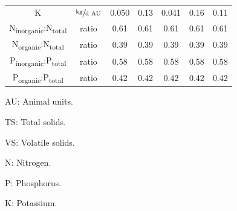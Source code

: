 \begin{refsection}[referencesCh6]
\begin{table}[h]
{\begin{threeparttable}
\begin{tabular}{@{}ccccccc@{}}
				K                 & $\sfrac{\text{kg}}{\text{d AU}}$ & 0.050          & 0.13          & 0.041 & 0.16            & 0.11                   \\
				N\textsubscript{inorganic}:N\textsubscript{total} & ratio     & 0.61          & 0.61          & 0.61 & 0.61            & 0.61                   \\
				N\textsubscript{organic}:N\textsubscript{total}   & ratio     & 0.39          & 0.39          & 0.39 & 0.39            & 0.39                   \\
				P\textsubscript{inorganic}:P\textsubscript{total} & ratio     & 0.58          & 0.58          & 0.58 & 0.58            & 0.58                   \\
				P\textsubscript{organic}:P\textsubscript{total}   & ratio     & 0.42          & 0.42          & 0.42 & 0.42            & 0.42                   \\ \bottomrule
			\end{tabular}
			\begin{tablenotes}
				\footnotesize
				\item AU: Animal units.
				\item TS: Total solids.
				\item VS: Volatile solids.
				\item N: Nitrogen.
				\item P: Phosphorus.
				\item K: Potassium.
			\end{tablenotes}
		\end{threeparttable}
	}
\end{table}


\end{refsection}
